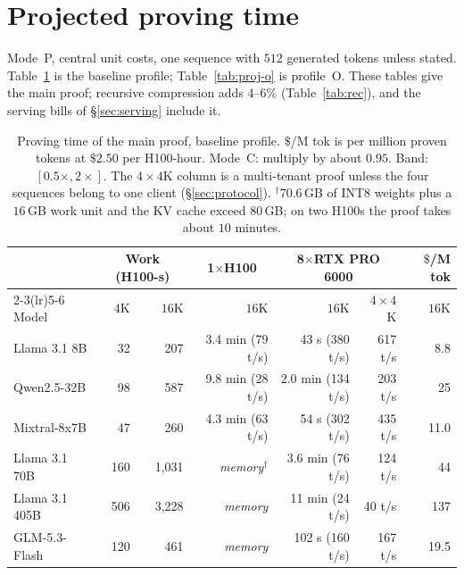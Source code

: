 \documentclass[11pt]{article}
\begin{document}
\section{Projected proving time}
\label{sec:proj}

Mode~P, central unit costs, one sequence with \(512\) generated tokens unless stated.
Table~\ref{tab:proj} is the baseline profile; Table~\ref{tab:proj-o} is profile~O.
These tables give the main proof; recursive compression adds \(4\)--\(6\%\) (Table~\ref{tab:rec}), and the serving bills of \S\ref{sec:serving} include it.

\begin{table}[h]
\centering\small
\begin{tabular}{@{}lrrrrrr@{}}
\toprule
& \multicolumn{2}{c}{Work (H100-s)} & \multicolumn{1}{c}{1\(\times\)H100} & \multicolumn{2}{c}{8\(\times\)RTX PRO 6000} & \(\$\)/M tok \\
\cmidrule(lr){2-3}\cmidrule(lr){5-6}
Model & \(4\)K & \(16\)K & \(16\)K & \(16\)K & \(4{\times}4\)K & \(16\)K \\
\midrule
Llama 3.1 8B & 32 & 207 & 3.4 min (79 t/s) & 43 s (380 t/s) & 617 t/s & 8.8 \\
Qwen2.5-32B & 98 & 587 & 9.8 min (28 t/s) & 2.0 min (134 t/s) & 203 t/s & 25 \\
Mixtral-8x7B & 47 & 260 & 4.3 min (63 t/s) & 54 s (302 t/s) & 435 t/s & 11.0 \\
Llama 3.1 70B & 160 & 1{,}031 & \emph{memory}\(^\dagger\) & 3.6 min (76 t/s) & 124 t/s & 44 \\
Llama 3.1 405B & 506 & 3{,}228 & \emph{memory} & 11 min (24 t/s) & 40 t/s & 137 \\
GLM-5.3-Flash & 120 & 461 & \emph{memory} & 102 s (160 t/s) & 167 t/s & 19.5 \\
\bottomrule
\end{tabular}
\caption{Proving time of the main proof, baseline profile. \(\$\)/M tok is per million proven tokens at \(\$2.50\) per H100-hour. Mode~C: multiply by about \(0.95\). Band: \([0.5\times, 2\times]\). The \(4{\times}4\)K column is a multi-tenant proof unless the four sequences belong to one client (\S\ref{sec:protocol}).
\(^\dagger\)\(70.6\)\,GB of INT8 weights plus a \(16\)\,GB work unit and the KV cache exceed \(80\)\,GB; on two H100s the proof takes about \(10\) minutes.}
\label{tab:proj}
\end{table}
\end{document}
